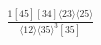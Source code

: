 \documentclass[varwidth, border=5pt]{standalone}
\begin{document}
\begin{my}
$\begin{gathered}
\scriptscriptstyle\frac{1[45][34]⟨23⟩⟨25⟩}{⟨12⟩⟨35⟩^3[35]}
\end{gathered}$
\end{my}
\end{document}
